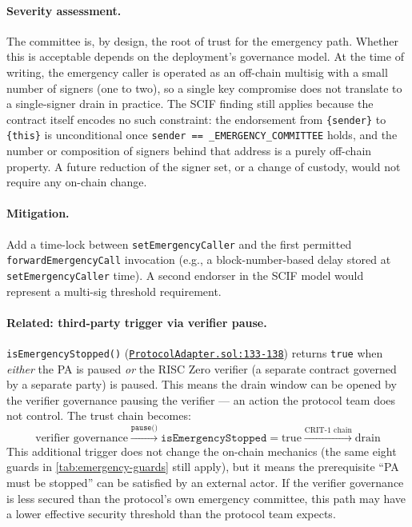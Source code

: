\documentclass[11pt,a4paper]{article}
\newcommand{\paRepoRoot}{https://github.com/anoma/pa-evm/blob/main/contracts/src}
\newcommand{\parefR}[3]{\href{\paRepoRoot/#1\#L#2-L#3}{\nolinkurl{#1:#2-#3}}}
\begin{document}
\paragraph{Severity assessment.} The committee is, by design, the root of
trust for the emergency path. Whether this is acceptable depends on the
deployment's governance model. At the time of writing, the emergency caller
is operated as an off-chain multisig with a small number of signers (one to
two), so a single key compromise does not translate to a single-signer drain
in practice. The SCIF finding still applies because the contract itself
encodes no such constraint: the endorsement from \texttt{\{sender\}} to
\texttt{\{this\}} is unconditional once \texttt{sender == \_EMERGENCY\_COMMITTEE}
holds, and the number or composition of signers behind that address is a
purely off-chain property. A future reduction of the signer set, or a change
of custody, would not require any on-chain change.

\paragraph{Mitigation.} Add a time-lock between \texttt{setEmergencyCaller}
and the first permitted \texttt{forwardEmergencyCall} invocation (e.g., a
block-number-based delay stored at \texttt{setEmergencyCaller} time). A second
endorser in the SCIF model would represent a multi-sig threshold requirement.

\paragraph{Related: third-party trigger via verifier pause.}
\texttt{isEmergencyStopped()} (\parefR{ProtocolAdapter.sol}{133}{138})
returns \texttt{true} when \emph{either} the PA is paused \emph{or} the
RISC Zero verifier (a separate contract governed by a separate party) is
paused. This means the drain window can be opened by the verifier
governance pausing the verifier --- an action the protocol team does not
control. The trust chain becomes:
\[
  \text{verifier governance}
  \xrightarrow{\texttt{pause()}}
  \texttt{isEmergencyStopped} = \text{true}
  \xrightarrow{\text{CRIT-1 chain}}
  \text{drain}
\]
This additional trigger does not change the on-chain mechanics (the same
eight guards in \cref{tab:emergency-guards} still apply), but it means
the prerequisite ``PA must be stopped'' can be satisfied by an external
actor. If the verifier governance is less secured than the protocol's own
emergency committee, this path may have a lower effective security
threshold than the protocol team expects.
\end{document}
